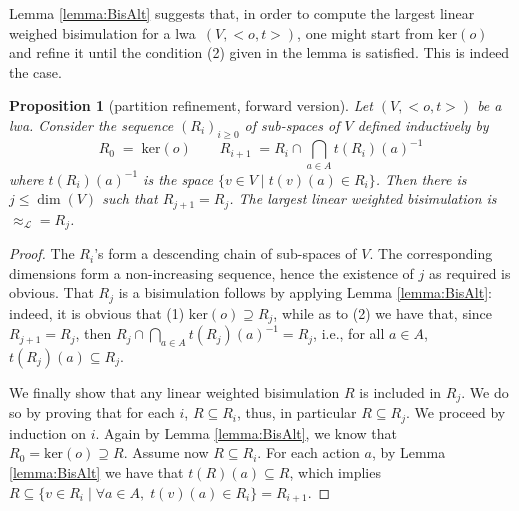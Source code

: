 \documentclass[3p]{elsarticle}
\newcommand{\cbox}[1]{\vspace{0.2cm}\noindent
  \fbox{\parbox{.97\textwidth}{#1}}\vspace{0.2cm}}
\newcommand{\fL}{\mathcal{L}}    %
\newcommand{\kernel}{\mathrm{ker}} %
\newcommand{\lwa}{{\sc lwa}}           %
\newcommand{\R}{R}%
\newtheorem{lemma}{Lemma}
\newtheorem{proposition}{Proposition}
\begin{document}
%
%

Lemma \ref{lemma:BisAlt} suggests that, in order to compute the
largest linear weighed bisimulation for a \lwa\ $(V,<o,t>)$, one
might start from $\kernel(o)$ and refine it until the condition (2)
given in the lemma is satisfied. This is indeed the case.


\begin{proposition}[partition refinement, forward version]\label{prop:forw}
Let $(V,<o,t>)$ be a \lwa. Consider the sequence $(R_i)_{i\geq 0}$
of sub-spaces of $V$ defined inductively by
\[
R_0\;=\; \kernel(o)\quad\quad R_{i+1}\;=R_i \cap \bigcap_{a\in A}
t(R_i)(a)^{-1}
\]
where $t(R_i)(a)^{-1}$ is the space $\{v\in V \;|\; t(v)(a)\in
R_i\}$. Then there is $j\leq\dim(V)$ such that $R_{j+1}=R_j$. The
largest linear weighted bisimulation is $\approx_\fL=R_j$.
\end{proposition}

\begin{proof}
The $R_i$'s form a descending chain of sub-spaces of $V$. The
corresponding dimensions form a non-increasing sequence, hence the
existence of   $j$ as required is obvious. That $R_j$ is a
bisimulation follows by applying Lemma \ref{lemma:BisAlt}: indeed,
it is obvious that (1) $\kernel(o)\supseteq R_j$, while as to (2) we
have that, since $R_{j+1}=R_j$, then $R_j \cap \bigcap_{a\in A}
t(R_j)(a)^{-1}=R_j$, i.e.,  for all $ a \in A$, $t(R_j)(a)\subseteq
R_j$.

We finally show that any  linear weighted bisimulation $R$ is
included in $\R_j$. We do so by proving that for each $i$,
$R\subseteq \R_i$, thus, in particular $R\subseteq \R_j$. We proceed
by induction on $i$. Again by Lemma \ref{lemma:BisAlt}, we know that
$\R_0=\kernel(o)\supseteq R$. Assume now $R\subseteq \R_i$. For each
action $a$, by Lemma \ref{lemma:BisAlt} we have that
$t(R)(a)\subseteq R$, which implies $R\subseteq \{v\in R_i \;|\;
\forall a\in A,\; t(v)(a)\in R_i\} = R_{i+1}$.
\end{proof}
\end{document}
